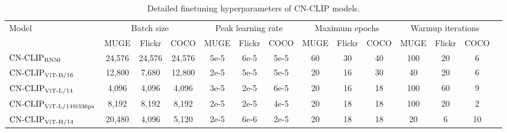 \documentclass[11pt]{article}
\begin{document}
\begin{table*}[t]
\center
\begin{adjustbox}{max width=1.\textwidth}
\begin{tabular}{@{\extracolsep{\fill}}lccccccccccccc}
\toprule
  \multirow{2}{*}{Model}
  & \multicolumn{3}{c}{Batch size}
  & \multicolumn{3}{c}{Peak learning rate}
  & \multicolumn{3}{c}{Maximum epochs}
  & \multicolumn{3}{c}{Warmup iterations}

  \\
  & MUGE
  & Flickr
  & COCO
  & MUGE
  & Flickr
  & COCO
  & MUGE
  & Flickr
  & COCO
  & MUGE
  & Flickr
  & COCO
  \\
\midrule
    $\text{CN-CLIP}\rm_{RN50}$
    & 24,576
    & 24,576
    & 24,576
    & 5e-5
    & 6e-5
    & 5e-5
    & 60
    & 30
    & 40
    & 100
    & 20
    & 6
    \\
    $\text{CN-CLIP}\rm_{ViT\text{-}B/16}$
    & 12,800
    & 7,680
    & 12,800
    & 2e-5
    & 5e-5
    & 5e-5
    & 20
    & 16
    & 30
    & 40
    & 20
    & 6
    \\
    $\text{CN-CLIP}\rm_{ViT\text{-}L/14}$
    & 4,096
    & 4,096
    & 4,096
    & 3e-5
    & 2e-5
    & 6e-5
    & 20
    & 16
    & 18
    & 100
    & 60
    & 9
    \\
    $\text{CN-CLIP}\rm_{ViT\text{-}L/14@336px}$
    & 8,192
    & 8,192
    & 8,192
    & 2e-5
    & 2e-5
    & 4e-5
    & 20
    & 18
    & 18
    & 100
    & 20
    & 2
    \\
    $\text{CN-CLIP}\rm_{ViT\text{-}H/14}$
    & 20,480
    & 4,096
    & 5,120
    & 2e-5
    & 6e-6
    & 2e-5
    & 20
    & 18
    & 18
    & 20
    & 6
    & 10
    \\
\bottomrule
\end{tabular}
\end{adjustbox}
\caption{Detailed finetuning hyperparameters of CN-CLIP models.}
\label{tb:detailed_finetune}
\end{table*}
\end{document}
